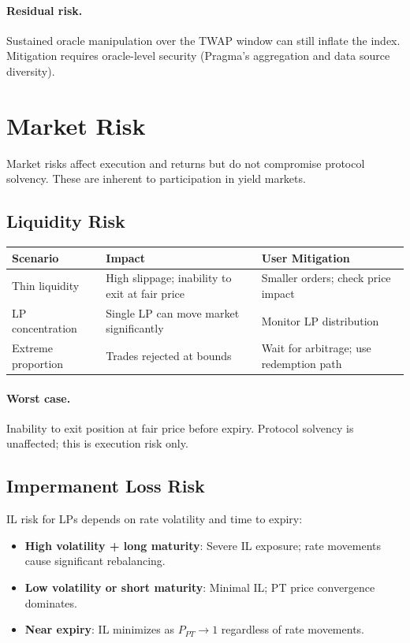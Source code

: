 \paragraph{Residual risk.} Sustained oracle manipulation over the TWAP window can still inflate the index. Mitigation requires oracle-level security (Pragma's aggregation and data source diversity).

\section{Market Risk}

Market risks affect execution and returns but do not compromise protocol solvency. These are inherent to participation in yield markets.

\subsection{Liquidity Risk}

\begin{center}
\begin{tabularx}{\textwidth}{l >{\raggedright\arraybackslash}X l}
\toprule
\textbf{Scenario} & \textbf{Impact} & \textbf{User Mitigation} \\
\midrule
Thin liquidity & High slippage; inability to exit at fair price & Smaller orders; check price impact \\
LP concentration & Single LP can move market significantly & Monitor LP distribution \\
Extreme proportion & Trades rejected at bounds & Wait for arbitrage; use redemption path \\
\bottomrule
\end{tabularx}
\end{center}

\paragraph{Worst case.} Inability to exit position at fair price before expiry. Protocol solvency is unaffected; this is execution risk only.

\subsection{Impermanent Loss Risk}

IL risk for LPs depends on rate volatility and time to expiry:

\begin{itemize}
\item \textbf{High volatility + long maturity}: Severe IL exposure; rate movements cause significant rebalancing.
\item \textbf{Low volatility or short maturity}: Minimal IL; PT price convergence dominates.
\item \textbf{Near expiry}: IL minimizes as $P_{PT} \to 1$ regardless of rate movements.
\end{itemize}

